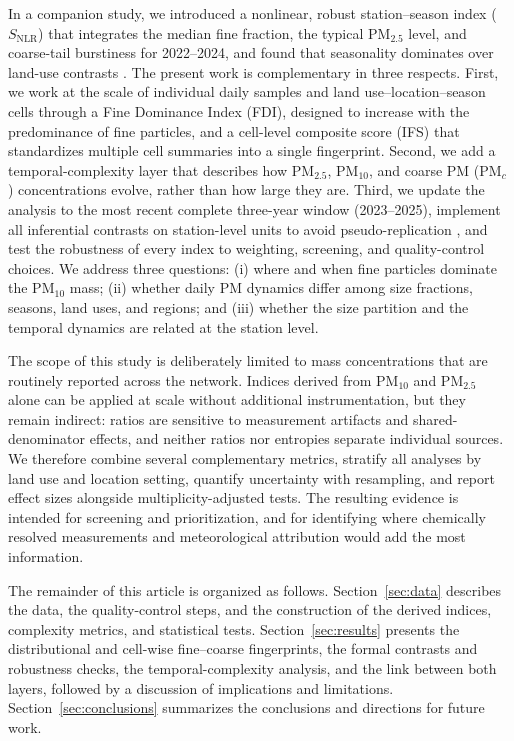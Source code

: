 \documentclass[a4paper,fleqn]{cas-sc}
\begin{document}
In a companion study, we introduced a nonlinear, robust station--season index ($S_{\mathrm{NLR}}$) that integrates the median fine fraction, the typical PM$_{2.5}$ level, and coarse-tail burstiness for 2022--2024, and found that seasonality dominates over land-use contrasts \citep{SierraPorta2026}. The present work is complementary in three respects. First, we work at the scale of individual daily samples and land use--location--season cells through a Fine Dominance Index (FDI), designed to increase with the predominance of fine particles, and a cell-level composite score (IFS) that standardizes multiple cell summaries into a single fingerprint. Second, we add a temporal-complexity layer that describes how PM$_{2.5}$, PM$_{10}$, and coarse PM (PM$_{c}$) concentrations evolve, rather than how large they are. Third, we update the analysis to the most recent complete three-year window (2023--2025), implement all inferential contrasts on station-level units to avoid pseudo-replication \citep{Hurlbert1984}, and test the robustness of every index to weighting, screening, and quality-control choices. We address three questions: (i) where and when fine particles dominate the PM$_{10}$ mass; (ii) whether daily PM dynamics differ among size fractions, seasons, land uses, and regions; and (iii) whether the size partition and the temporal dynamics are related at the station level.

The scope of this study is deliberately limited to mass concentrations that are routinely reported across the network. Indices derived from PM$_{10}$ and PM$_{2.5}$ alone can be applied at scale without additional instrumentation, but they remain indirect: ratios are sensitive to measurement artifacts and shared-denominator effects, and neither ratios nor entropies separate individual sources. We therefore combine several complementary metrics, stratify all analyses by land use and location setting, quantify uncertainty with resampling, and report effect sizes alongside multiplicity-adjusted tests. The resulting evidence is intended for screening and prioritization, and for identifying where chemically resolved measurements and meteorological attribution would add the most information.

The remainder of this article is organized as follows. Section~\ref{sec:data} describes the data, the quality-control steps, and the construction of the derived indices, complexity metrics, and statistical tests. Section~\ref{sec:results} presents the distributional and cell-wise fine--coarse fingerprints, the formal contrasts and robustness checks, the temporal-complexity analysis, and the link between both layers, followed by a discussion of implications and limitations. Section~\ref{sec:conclusions} summarizes the conclusions and directions for future work.
\end{document}
